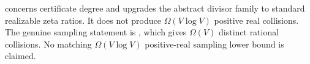 \begin{remark}
\label{rem:three-sharpness-levels}
 concerns certificate
degree and upgrades the abstract divisor family to standard realizable zeta
ratios.  It does not produce \(\Omega(V\log V)\) positive real collisions.
The genuine sampling statement is
, which gives \(\Omega(V)\)
distinct rational collisions.  No matching \(\Omega(V\log V)\) positive-real
sampling lower bound is claimed.
\end{remark}
